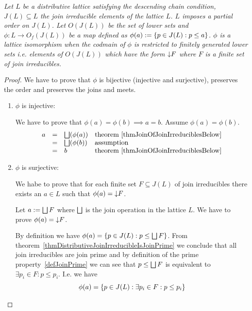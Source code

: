 \begin{theorem}
    \label{thmBirkhoffRepresentation}
    \emph{
        Let $L$ be a distributive lattice satisfying the descending chain
        condition, $J(L) \subseteq L$ the join irreducible elements of the
        lattice $L$. $L$ imposes a partial order on $J(L)$. Let $O(J(L))$ be
        the set of lower sets and
        $\phi: L \to O_f(J(L))$ be a map defined as
        $\phi(a) := \left\{p \in J(L): p \le a\right\}$.
        $\phi$ is a lattice isomorphism when the codmain of
        $\phi$ is restricted to finitely generated lower sets i.e. elements of
        $O(J(L))$ which have the form ${\downarrow} F$ where $F$ is a finite set
        of join irreducibles.
    }

    \begin{proof}
        We have to prove that $\phi$ is bijective (injective and surjective),
        preserves the order and preserves the joins and meets.

        \begin{enumerate}
            \item $\phi$ is injective:

                We have to prove that $\phi(a) = \phi(b) \implies a = b$. Assume
                $\phi(a) = \phi(b)$.
                $$
                \begin{array}{lllll} 
                    a &=& \bigsqcup(\phi(a))
                    & \text{theorem~\ref{thmJoinOfJoinIrreduciblesBelow}}
                    \\
                    &=& \bigsqcup(\phi(b)) &\text{assumption}
                    \\
                    &=& b
                    & \text{theorem~\ref{thmJoinOfJoinIrreduciblesBelow}}
                 \end{array}
                $$

            \item $\phi$ is surjective:

                We habe to prove that for each finite set $F \subseteq J(L)$ of
                join irreducibles there exists an $a \in L$ such that $\phi(a) =
                {\downarrow} F$.

                Let $a := \bigsqcup F$ where $\bigsqcup$ is the join operation in
                the lattice $L$. We have to prove $\phi(a) = {\downarrow} F$.

                By definition we have
                $\phi(a) = \left\{p \in J(L): p \le \bigsqcup F\right\}$.
                From theorem~\ref{thmDistributiveJoinIrreducibleIsJoinPrime} we
                conclude that all join irreducibles are join prime and by
                definition of the prime property~\ref{defJoinPrime} we can see
                that $p \le \bigsqcup F$ is equivalent to $\exists p_i \in F: p
                \le p_i$. I.e. we have
                $$
                    \phi(a) = \left\{p \in J(L): \exists p_i \in F: p \le p_i\right\}
                $$


\end{enumerate}
\end{proof}
\end{theorem}

